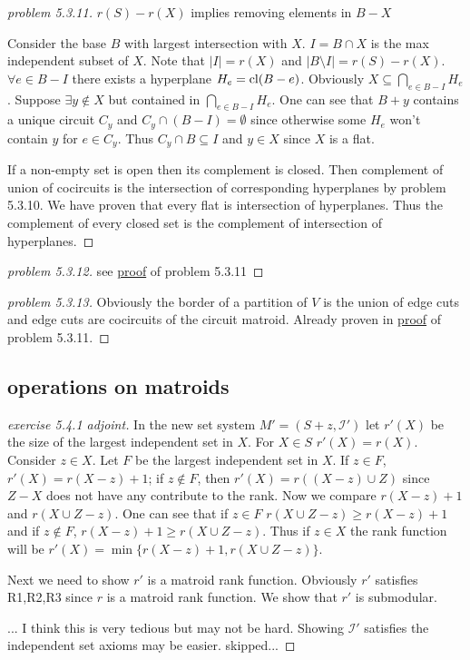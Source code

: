 \begin{proof}[problem 5.3.11]\label{proof:5311}
    {\scriptsize $r(S)-r(X)$ implies removing elements in $B-X$}

    Consider the base $B$ with largest intersection with $X$. $I=B\cap X$ is the max independent subset of $X$. Note that $|I|=r(X)$ and $|B\setminus I|=r(S)-r(X)$. $\forall e\in B-I$ there exists a hyperplane $H_e=\operatorname{cl}(B-e)$. Obviously $X\subseteq \bigcap_{e\in B-I}H_e$. Suppose $\exists y\notin X$ but contained in $\bigcap_{e\in B-I}H_e$. One can see that $B+y$ contains a unique circuit $C_y$ and $C_y\cap (B-I)=\emptyset$ since otherwise some $H_e$ won't contain $y$ for $e\in C_y$. Thus $C_y\cap B\subseteq I$ and $y\in X$ since $X$ is a flat.

    If a non-empty set is open then its complement is closed. Then complement of union of cocircuits is the intersection of corresponding hyperplanes by problem 5.3.10. We have proven that every flat is intersection of hyperplanes. Thus the complement of every closed set is the complement of intersection of hyperplanes.
\end{proof}
\begin{proof}[problem 5.3.12]
    see \hyperref[proof:5311]{proof} of problem 5.3.11
\end{proof}
\begin{proof}[problem 5.3.13]
    Obviously the border of a partition of $V$ is the union of edge cuts and edge cuts are cocircuits of the circuit matroid. Already proven in \hyperref[proof:5311]{proof} of problem 5.3.11.
\end{proof}
\subsection{operations on matroids}
\begin{proof}[exercise 5.4.1 adjoint]
    In the new set system $M'=(S+z,\mathcal I')$ let $r'(X)$ be the size of the largest independent set in $X$. For $X\in S$ $r'(X)=r(X)$. Consider $z\in X$. Let $F$ be the largest independent set in $X$. If $z\in F$, $r'(X)=r(X-z)+1$; if $z\notin F$, then $r'(X)=r((X-z)\cup Z)$ since $Z-X$ does not have any contribute to the rank. Now we compare $r(X-z)+1$ and $r(X\cup Z -z)$. One can see that if $z\in F$ $r(X\cup Z -z)\geq r(X-z)+1$ and if $z\notin F$, $r(X-z)+1 \geq r(X\cup Z -z)$. Thus if $z\in X$ the rank function will be $r'(X)=\min\{r(X-z)+1, r(X\cup Z -z)\}$.

    Next we need to show $r'$ is a matroid rank function. Obviously $r'$ satisfies R1,R2,R3 since $r$ is a matroid rank function. We show that $r'$ is submodular.

    ... I think this is very tedious but may not be hard. Showing $\mathcal I'$ satisfies the independent set axioms may be easier. skipped...
\end{proof}

